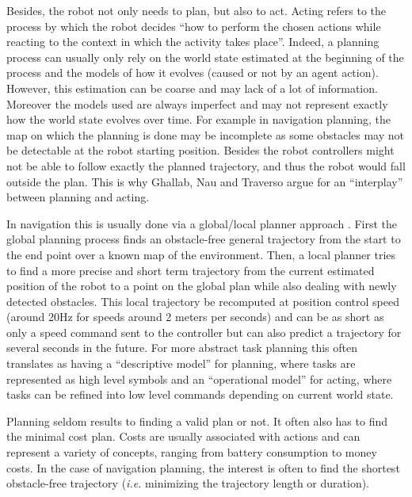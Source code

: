 \documentclass[a4paper,11pt,twoside]{StyleThese}
\begin{document}
Besides, the robot not only needs to plan, but also to act. Acting refers to the process by which the robot decides ``how to perform the chosen actions while reacting to the context in which the activity takes place''. Indeed, a planning process can usually only rely on the world state estimated at the beginning of the process and the models of how it evolves (caused or not by an agent action). However, this estimation can be coarse and may lack of a lot of information. Moreover the models used are always imperfect and may not represent exactly how the world state evolves over time. For example in navigation planning, the map on which the planning is done may be incomplete as some obstacles may not be detectable at the robot starting position. Besides the robot controllers might not be able to follow exactly the planned trajectory, and thus the robot would fall outside the plan. This is why Ghallab, Nau and Traverso argue for an ``interplay'' between planning and acting.

In navigation this is usually done via a global/local planner approach \cite{choset2005principles}. First the global planning process finds an obstacle-free general trajectory from the start to the end point over a known map of the environment. Then, a local planner tries to find a more precise and short term trajectory from the current estimated position of the robot to a point on the global plan while also dealing with newly detected obstacles. This local trajectory be recomputed at position control speed (around 20Hz for speeds around 2 meters per seconds) and can be as short as only a speed command sent to the controller but can also predict a trajectory for several seconds in the future. For more abstract task planning this often translates as having a ``descriptive model'' for planning, where tasks are represented as high level symbols and an ``operational model'' for acting, where tasks can be refined into low level commands depending on current world state.

Planning seldom results to finding a valid plan or not. It often also has to find the minimal cost plan. Costs are usually associated with actions and can represent a variety of concepts, ranging from battery consumption to money costs. In the case of navigation planning, the interest is often to find the shortest obstacle-free trajectory (\textit{i.e.} minimizing the trajectory length or duration).
\end{document}

